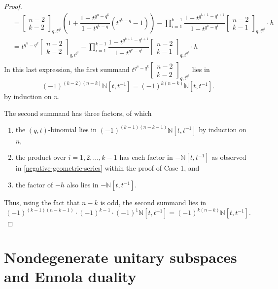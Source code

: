 \documentclass[10pt]{amsart}
\theoremstyle{plain}
\theoremstyle{definition}
\theoremstyle{remark}
\numberwithin{equation}{section}
\newcommand\qbin[3]{\left[\begin{matrix} #1 \\ #2 \end{matrix} \right]_{#3}}
\newcommand\NN{\mathbb{N}}
\begin{document}
\begin{proof}
$$\begin{aligned}
&=  \qbin{n-2}{k-2}{q,t^{q^2}} 
      \left( 1 + \dfrac{1-t^{q^{n}-q^{k}}}{1-t^{q^{k}-q}} (t^{q^{k}-q}-1) \right) -
         \prod_{i=1}^{k-1}\dfrac{1-t^{q^{k+1}-q^{i+1}}}{1-t^{q^{k}-q^{i}}} 
         \qbin{n-2}{k-1}{q,t^{q^2}}  \cdot h \\
&=  t^{q^{n}-q^{k}} \qbin{n-2}{k-2}{q,t^{q^2}} -
       \prod_{i=1}^{k-1}\dfrac{1-t^{q^{k+1}-q^{i+1}}}{1-t^{q^{k}-q^{i}}} 
         \qbin{n-2}{k-1}{q,t^{q^2}} \cdot h \\
\end{aligned}
$$
In this last expression, the first summand 
$t^{q^{n}-q^{k}}\qbin{n-2}{k-2}{q,t^{q^2}}$ lies in
$$
(-1)^{(k-2)(n-k)}\NN[t,t^{-1}]=(-1)^{k(n-k)}\NN[t,t^{-1}].
$$
by induction on $n$.

The second summand has three factors, of
which 
\begin{enumerate}
\item[$\bullet$]
the $(q,t)$-binomial lies in $(-1)^{(k-1)(n-k-1)}\NN[t,t^{-1}]$
by induction on $n$, 
\item[$\bullet$]
the product over $i=1,2,\ldots,k-1$ has
each factor in $-\NN[t,t^{-1}]$ as observed in 
\eqref{negative-geometric-series} within
the proof of Case 1, and 
\item[$\bullet$]
the factor of $-h$ also lies in $-\NN[t,t^{-1}]$.
\end{enumerate}
Thus, using the fact that $n-k$ is odd, the second summand lies in 
$$
(-1)^{(k-1)(n-k-1)} \cdot (-1)^{k-1} \cdot (-1)^1\NN[t,t^{-1}]=(-1)^{k(n-k)}\NN[t,t^{-1}].
$$
\end{proof}










\section{Nondegenerate unitary subspaces 
and Ennola duality}
\label{Ennola-section}
\end{document}
